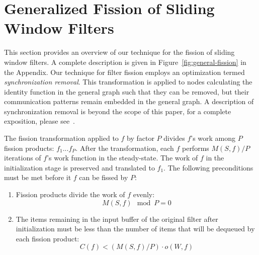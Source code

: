 \section{Generalized Fission of Sliding Window Filters}
\label{sec:fission}

This section provides an overview of our technique for the fission of
sliding window filters. A complete description is given in
Figure~\ref{fig:general-fission} in the Appendix.  Our technique for
filter fission employs an optimization termed {\it synchronization
  removal}.  This transformation is applied to nodes calculating the
identity function in the general graph such that they can be removed,
but their communication patterns remain embedded in the general
graph. A description of synchronization removal is beyond the scope of
this paper, for a complete exposition, please see~\cite{mgordon-phd}.

The fission transformation applied to $f$ by factor $P$ divides $f$'s
work among $P$ fission products: $f_1...f_P$.  After the
transformation, each $f$ performs $M(S,f) /P$ iterations of $f$'s work
function in the steady-state.  The work of $f$ in the initialization
stage is preserved and translated to $f_1$.  The following
preconditions must be met before it $f$ can be fissed by $P$:
\begin{enumerate}
\item Fission products divide the work of $f$ evenly:
{\ninepoint
\begin{equation}
M(S,f) \mod P = 0 
\label{eq:mod-fiss}
\end{equation}
}
\item The items remaining in the input buffer of the original filter
  after initialization must be less than the number of items that will
  be dequeued by each fission product:
{\ninepoint
\begin{equation}
C(f) < (M(S,f) / P) \cdot o(W, f)
\label{eq:fiss-precond1}
\end{equation}
}
\end{enumerate}

